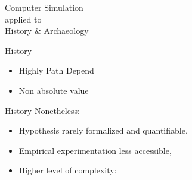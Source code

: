 \documentclass[12pt, notes=show]{beamer}
\begin{document}
%

\begin{frame}
    \begin{center}
	\Huge
	Computer Simulation \\ applied to\\  History \& Archaeology
    \end{center}
\end{frame}


\begin{frame}{History}

    \begin{itemize}
	\item <3-> Highly Path Depend
	\item <4-> Non absolute value
    \end{itemize}
    
\end{frame}

\begin{frame}{History}
    Nonetheless:
    \begin{itemize}
	\item<2-> Hypothesis rarely formalized and quantifiable, 
	\item<3-> Empirical experimentation less accessible,
	\item<4-> Higher level of complexity:
    \end{itemize}
\end{frame}
\end{document}
